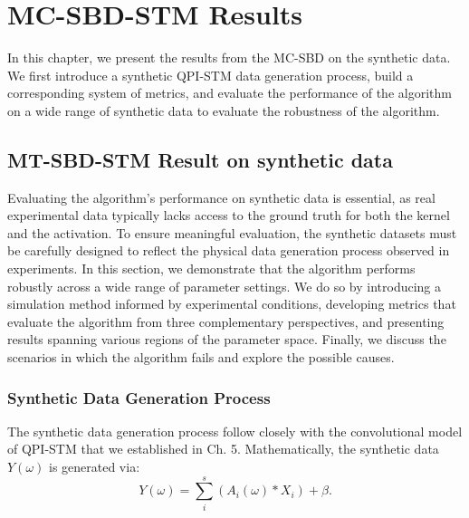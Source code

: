 \chapter{MC-SBD-STM Results}
In this chapter, we present the results from the \ac{MC-SBD} on the synthetic data. We first introduce a synthetic QPI-STM data generation process, build a corresponding system of metrics, and evaluate the performance of the algorithm on a wide range of synthetic data to evaluate the robustness of the algorithm. 

\section{MT-SBD-STM Result on synthetic data}
Evaluating the algorithm's performance on synthetic data is essential, as real experimental data typically lacks access to the ground truth for both the kernel and the activation. To ensure meaningful evaluation, the synthetic datasets must be carefully designed to reflect the physical data generation process observed in experiments. In this section, we demonstrate that the algorithm performs robustly across a wide range of parameter settings. We do so by introducing a simulation method informed by experimental conditions, developing metrics that evaluate the algorithm from three complementary perspectives, and presenting results spanning various regions of the parameter space. Finally, we discuss the scenarios in which the algorithm fails and explore the possible causes.

\subsection{Synthetic Data Generation Process}
The synthetic data generation process follow closely with the convolutional model of QPI-STM that we established in Ch. 5. Mathematically, the synthetic data $Y(\omega)$ is generated via:
\begin{equation}
	Y(\omega) = \sum_i^s ( A_i(\omega) * X_i) + \beta. 
\end{equation} 


